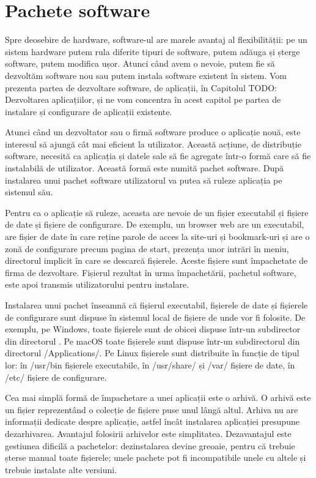 \chapter{Pachete software}
\label{chapter:package}

Spre deosebire de hardware, software-ul are marele avantaj al flexibilității: pe un sistem hardware putem rula diferite tipuri de software, putem adăuga și șterge software, putem modifica ușor. Atunci când avem o nevoie, putem fie să dezvoltăm software nou sau putem instala software existent în sistem. Vom prezenta partea de dezvoltare software, de aplicații, în Capitolul TODO: Dezvoltarea aplicațiilor, și ne vom concentra în acest capitol pe partea de instalare și configurare de aplicații existente.

Atunci când un dezvoltator sau o firmă software produce o aplicație nouă, este interesul să ajungă cât mai eficient la utilizator. Această acțiune, de distribuție software, necesită ca aplicația și datele sale să fie agregate într-o formă care să fie instalabilă de utilizator. Această formă este numită pachet software. După instalarea unui pachet software utilizatorul va putea să ruleze aplicația pe sistemul său.

Pentru ca o aplicație să ruleze, aceasta are nevoie de un fișier executabil și fișiere de date și fișiere de configurare. De exemplu, un browser web are un executabil, are fișier de date în care reține parole de acces la site-uri și bookmark-uri și are o zonă de configurare precum pagina de start, prezența unor intrări în meniu, directorul implicit în care se descarcă fișierele. Aceste fișiere sunt împachetate de firma de dezvoltare. Fișierul rezultat în urma împachetării, pachetul software, este apoi transmis utilizatorului pentru instalare. 

Instalarea unui pachet înseamnă că fișierul executabil, fișierele de date și fișierele de configurare sunt dispuse în sistemul local de fișiere de unde vor fi folosite. De exemplu, pe Windows, toate fișierele sunt de obicei dispuse într-un subdirector din directorul . Pe macOS toate fișierele sunt dispuse într-un subdirectorul din directorul /Applications/. Pe Linux fișierele sunt distribuite în funcție de tipul lor: în /usr/bin fișierele executabile, în /usr/share/ și /var/ fișiere de date, în /etc/ fișiere de configurare.

Cea mai simplă formă de împachetare a unei aplicații este o arhivă. O arhivă este un fișier reprezentând o colecție de fișiere puse unul lângă altul. Arhiva nu are informații dedicate despre aplicație, astfel încât instalarea aplicației presupune dezarhivarea. Avantajul folosirii arhivelor este simplitatea. Dezavantajul este gestiunea dificilă a pachetelor: dezinstalarea devine greoaie, pentru că trebuie șterse manual toate fișierele; unele pachete pot fi incompatibile unele cu altele și trebuie instalate alte versiuni.

